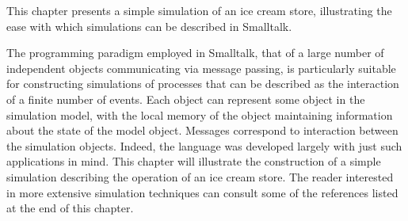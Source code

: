 \secdown

This chapter presents a simple simulation of an ice cream store, illustrating
the ease with which simulations can be described in Smalltalk.

\bigskip

The programming paradigm employed in Smalltalk, that of a large number of
independent objects communicating via message passing, is particularly suitable
for constructing simulations of processes that can be described as the
interaction of a finite number of events. Each object can represent some object
in the simulation model, with the local memory of the object maintaining
information about the state of the model object. Messages correspond to
interaction between the simulation objects. Indeed, the language was developed
largely with just such applications in mind. This chapter will illustrate the
construction of a simple simulation describing the operation of an ice cream
store. The reader interested in more extensive simulation techniques can consult
some of the references listed at the end of this chapter.





